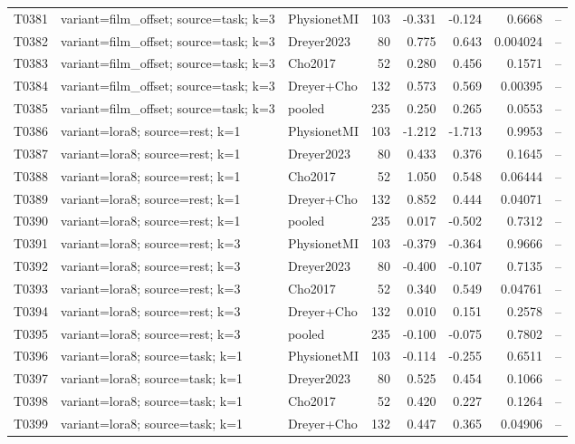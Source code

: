\begin{longtable}{p{.45in}p{2.6in}p{.75in}rrrrr}
T0381 & variant=film\_\allowbreak{}offset; source=task; k=3 & PhysionetMI & 103 & -0.331 & -0.124 & 0.6668 & -- \\
T0382 & variant=film\_\allowbreak{}offset; source=task; k=3 & Dreyer2023 & 80 & 0.775 & 0.643 & 0.004024 & -- \\
T0383 & variant=film\_\allowbreak{}offset; source=task; k=3 & Cho2017 & 52 & 0.280 & 0.456 & 0.1571 & -- \\
T0384 & variant=film\_\allowbreak{}offset; source=task; k=3 & Dreyer+Cho & 132 & 0.573 & 0.569 & 0.00395 & -- \\
T0385 & variant=film\_\allowbreak{}offset; source=task; k=3 & pooled & 235 & 0.250 & 0.265 & 0.0553 & -- \\
T0386 & variant=lora8; source=rest; k=1 & PhysionetMI & 103 & -1.212 & -1.713 & 0.9953 & -- \\
T0387 & variant=lora8; source=rest; k=1 & Dreyer2023 & 80 & 0.433 & 0.376 & 0.1645 & -- \\
T0388 & variant=lora8; source=rest; k=1 & Cho2017 & 52 & 1.050 & 0.548 & 0.06444 & -- \\
T0389 & variant=lora8; source=rest; k=1 & Dreyer+Cho & 132 & 0.852 & 0.444 & 0.04071 & -- \\
T0390 & variant=lora8; source=rest; k=1 & pooled & 235 & 0.017 & -0.502 & 0.7312 & -- \\
T0391 & variant=lora8; source=rest; k=3 & PhysionetMI & 103 & -0.379 & -0.364 & 0.9666 & -- \\
T0392 & variant=lora8; source=rest; k=3 & Dreyer2023 & 80 & -0.400 & -0.107 & 0.7135 & -- \\
T0393 & variant=lora8; source=rest; k=3 & Cho2017 & 52 & 0.340 & 0.549 & 0.04761 & -- \\
T0394 & variant=lora8; source=rest; k=3 & Dreyer+Cho & 132 & 0.010 & 0.151 & 0.2578 & -- \\
T0395 & variant=lora8; source=rest; k=3 & pooled & 235 & -0.100 & -0.075 & 0.7802 & -- \\
T0396 & variant=lora8; source=task; k=1 & PhysionetMI & 103 & -0.114 & -0.255 & 0.6511 & -- \\
T0397 & variant=lora8; source=task; k=1 & Dreyer2023 & 80 & 0.525 & 0.454 & 0.1066 & -- \\
T0398 & variant=lora8; source=task; k=1 & Cho2017 & 52 & 0.420 & 0.227 & 0.1264 & -- \\
T0399 & variant=lora8; source=task; k=1 & Dreyer+Cho & 132 & 0.447 & 0.365 & 0.04906 & -- \\

\end{longtable}
